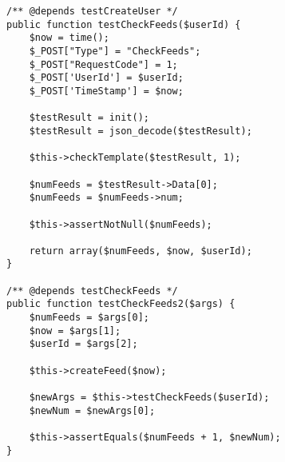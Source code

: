 \begin{lstlisting}[language=phpstyle, label=lst:testCheckFeeds, caption={checkFeeds unit test}]
/** @depends testCreateUser */
public function testCheckFeeds($userId) {
    $now = time();
    $_POST["Type"] = "CheckFeeds";
    $_POST["RequestCode"] = 1;
    $_POST['UserId'] = $userId;
    $_POST['TimeStamp'] = $now;

    $testResult = init();
    $testResult = json_decode($testResult);

    $this->checkTemplate($testResult, 1);

    $numFeeds = $testResult->Data[0];
    $numFeeds = $numFeeds->num;

    $this->assertNotNull($numFeeds);

    return array($numFeeds, $now, $userId);
}

/** @depends testCheckFeeds */
public function testCheckFeeds2($args) {
    $numFeeds = $args[0];
    $now = $args[1];
    $userId = $args[2];

    $this->createFeed($now);
    
    $newArgs = $this->testCheckFeeds($userId);
    $newNum = $newArgs[0];
    
    $this->assertEquals($numFeeds + 1, $newNum);
}
\end{lstlisting}
